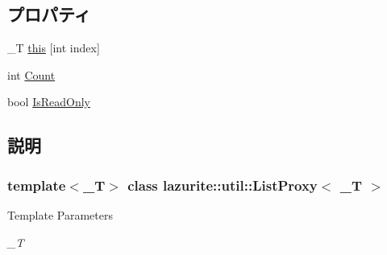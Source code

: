 \subsection*{プロパティ}
\begin{DoxyCompactItemize}
\item 
\_\-T \hyperlink{classlazurite_1_1util_1_1_list_proxy_3_01___t_01_4_aac0c88177c53164d656e44f500bb688c}{this} \mbox{[}int index\mbox{]}
\item 
int \hyperlink{classlazurite_1_1util_1_1_list_proxy_3_01___t_01_4_a50a35def3ef431c0d20e77b4a9462bfa}{Count}
\item 
bool \hyperlink{classlazurite_1_1util_1_1_list_proxy_3_01___t_01_4_aec7177935c783acbb65424f26995a664}{IsReadOnly}
\end{DoxyCompactItemize}


\subsection{説明}
\subsubsection*{template$<$\_\-T$>$ class lazurite::util::ListProxy$<$ \_\-T $>$}


\begin{DoxyTemplParams}{Template Parameters}
\item[{\em \_\-T}]\end{DoxyTemplParams}


